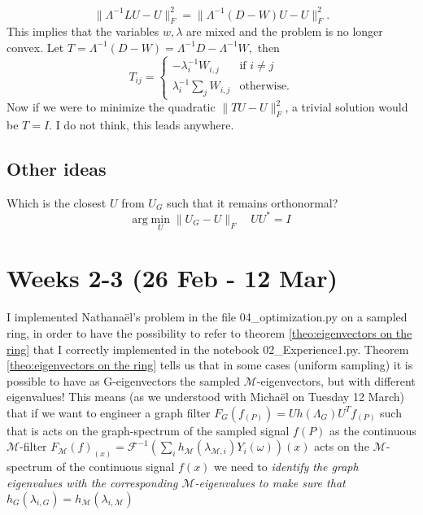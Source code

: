 \[
\|\Lambda^{-1}LU-U\|_{F}^{2}=\|\Lambda^{-1}(D-W)U-U\|_{F}^{2}.
\]
This implies that the variables $w,\lambda$ are mixed and the problem
is no longer convex. Let $T=\Lambda^{-1}(D-W)=\Lambda^{-1}D-\Lambda^{-1}W,$
then 
\[
T_{ij}=\begin{cases}
-\lambda_{i}^{-1}W_{i,j} & \text{if }i\ne j\\
\lambda_{i}^{-1}\sum_{j}W_{i,j} & \text{otherwise.}
\end{cases}
\]
Now if we were to minimize the quadratic $\|TU-U\|_{F}^{2}$, a trivial
solution would be $T=I.$ I do not think, this leads anywhere. 

\subsection{Other ideas}

Which is the closest $U$ from $U_{G}$ such that it remains orthonormal?
\[
\text{arg}\min_{U}\|U_{G}-U\|_{F}\hspace{1em}UU^{*}=I
\]

\section{Weeks 2-3 (26 Feb - 12 Mar)}

I implemented Nathana\"el's problem in the file 04\_optimization.py on a sampled ring, in order to have the possibility to refer to theorem \ref{theo:eigenvectors on the ring} that I correctly implemented in the notebook 02\_Experience1.py. Theorem \ref{theo:eigenvectors on the ring} tells us that in some cases (uniform sampling) it is possible to have as G-eigenvectors the sampled $\mathcal{M}$-eigenvectors, but with different eigenvalues! This means (as we understood with Micha\"el on Tuesday 12 March) that if we want to engineer a graph filter $F_G(f_{(P)}) = Uh(\Lambda_G)U^Tf_{(P)}$ such that is acts on the graph-spectrum of the sampled signal $f(P)$ as the continuous $\mathcal{M}$-filter $F_\mathcal M(f)_{(x)} =  \mathcal F^{-1}\left(\sum_i h_{\mathcal M}(\lambda_{\mathcal M, i}) Y_i(\omega)\right)(x)$ acts on the $\mathcal M$-spectrum of the continuous signal $f(x)$ we need to \textit{identify the graph eigenvalues with the corresponding $\mathcal M$-eigenvalues to make sure that $h_G(\lambda_{i,G}) = h_{\mathcal M}(\lambda_{i,\mathcal M}) $}









